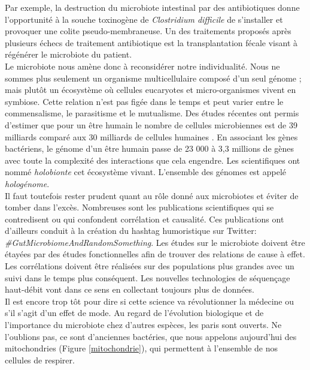 \documentclass[12pt,a4paper]{article}
\begin{document}
Par exemple, la destruction du microbiote intestinal par des antibiotiques donne l'opportunité à la souche toxinogène de \textit{Clostridium difficile} de s'installer et provoquer une colite pseudo-membraneuse. Un des traitements proposés après plusieurs échecs de traitement antibiotique est la transplantation fécale visant à régénérer le microbiote du patient. \\
Le microbiote nous amène donc à reconsidérer notre individualité. Nous ne sommes plus seulement un organisme multicellulaire composé d'un seul génome ; mais plutôt un écosystème où cellules eucaryotes et micro-organismes vivent en symbiose. Cette relation n'est pas figée dans le temps et peut varier entre le commensalisme, le parasitisme et le mutualisme. Des études récentes ont permis d'estimer que pour un être humain le nombre de cellules microbiennes est de 39 milliards comparé aux 30 milliards de cellules humaines \cite{Sender2016}. En associant les gènes bactériens, le génome d’un être humain passe de 23 000  à 3,3 millions de gènes \cite{Qin2010} avec toute la complexité des interactions que cela engendre. Les scientifiques ont nommé \textit{holobionte} cet écosystème vivant. L'ensemble des génomes est appelé \textit{hologénome}. \\
Il faut toutefois rester prudent quant au rôle donné aux microbiotes et éviter de tomber dans l'excès. Nombreuses sont les publications scientifiques qui se contredisent ou qui confondent corrélation et causalité. Ces publications ont d'ailleurs conduit à la création du hashtag humoristique sur Twitter: \textit{\#GutMicrobiomeAndRandomSomething}.
Les études sur le microbiote doivent être étayées par des études fonctionnelles afin de trouver des relations de cause à effet. Les corrélations doivent être réalisées sur des populations plus grandes avec un suivi dans le temps plus conséquent. Les nouvelles technologies de séquençage haut-débit vont dans ce sens en collectant toujours plus de données.\\
Il est encore trop tôt pour dire si cette science va révolutionner la médecine ou s’il s'agit d'un effet de mode. Au regard de l'évolution biologique et de l'importance du microbiote chez d'autres espèces, les paris sont ouverts. Ne l'oublions pas, ce sont d'anciennes bactéries, que nous appelons aujourd'hui des mitochondries (Figure \ref{mitochondrie}), qui permettent à l'ensemble de nos cellules de respirer.
\end{document}
